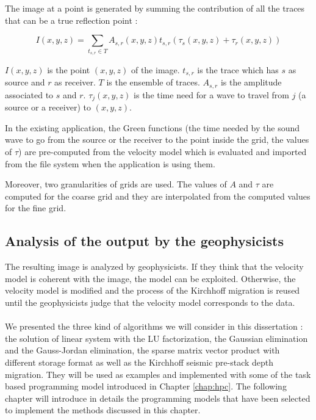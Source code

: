 The image at a point is generated by summing the contribution of all the traces that can be a true reflection point :


\begin{equation}
	I(x,y,z)=\sum_{t_{s,r} \in T}A_{s,r}(x,y,z)t_{s,r}(\tau_s(x,y,z) + \tau_r(x,y,z))
\end{equation}

$I(x,y,z)$ is the point $(x,y,z)$ of the image.
$t_{s,r}$ is the trace which has $s$ as source and $r$ as receiver.
$T$ is the ensemble of traces.
$A_{s,r}$ is the amplitude associated to $s$ and $r$.
$\tau_j(x,y,z)$  is the time need for a wave to travel from $j$ (a source or a receiver) to $(x,y,z)$.


In the existing application, the Green functions (the time needed by the sound wave to go from the source or the receiver to the point inside the grid, the values of $\tau$) are pre-computed from the velocity model which is evaluated and imported from the file system when the application is using them.

Moreover, two granularities of grids are used.
The values of $A$ and $\tau$ are computed for the coarse grid and they are interpolated from the computed values for the fine grid.


\subsection{Analysis of the output by the geophysicists}
The resulting image is analyzed by geophysicists.
If they think that the velocity model is coherent with the image, the model can be exploited.
Otherwise, the velocity model is modified and the process of the Kirchhoff migration is reused until the geophysicists judge that the velocity model corresponds to the data.

\paragraph{}
We presented the three kind of algorithms we will consider in this dissertation : the solution of linear system with the LU factorization, the Gaussian elimination and the Gauss-Jordan elimination, the sparse matrix vector product with different storage format as well as the Kirchhoff seismic pre-stack depth migration.
They will be used as examples and implemented with some of the task based programming model introduced in Chapter \ref{chap:hpc}.
The following chapter will introduce in details the programming models that have been selected to implement the methods discussed in this chapter.
